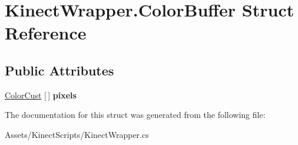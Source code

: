 \hypertarget{struct_kinect_wrapper_1_1_color_buffer}{}\section{Kinect\+Wrapper.\+Color\+Buffer Struct Reference}
\label{struct_kinect_wrapper_1_1_color_buffer}
\subsection*{Public Attributes}
\begin{DoxyCompactItemize}
\item 
\mbox{\label{struct_kinect_wrapper_1_1_color_buffer_af6c7fc494c351d8092b1020098fa4816}} 
\mbox{\hyperlink{struct_kinect_wrapper_1_1_color_cust}{Color\+Cust}} \mbox{[}$\,$\mbox{]} {\bfseries pixels}
\end{DoxyCompactItemize}


The documentation for this struct was generated from the following file\+:\begin{DoxyCompactItemize}
\item 
Assets/\+Kinect\+Scripts/Kinect\+Wrapper.\+cs\end{DoxyCompactItemize}
